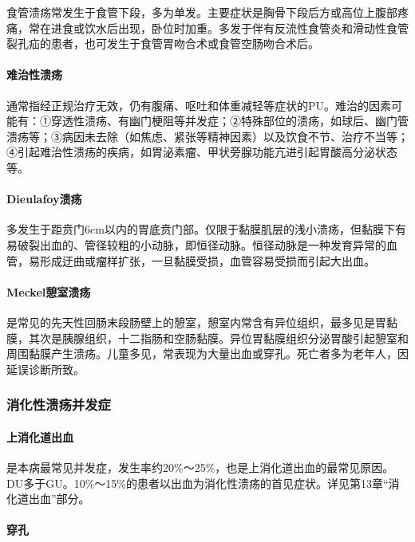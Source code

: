 食管溃疡常发生于食管下段，多为单发。主要症状是胸骨下段后方或高位上腹部疼痛，常在进食或饮水后出现，卧位时加重。多发于伴有反流性食管炎和滑动性食管裂孔疝的患者，也可发生于食管胃吻合术或食管空肠吻合术后。

\paragraph{难治性溃疡}

通常指经正规治疗无效，仍有腹痛、呕吐和体重减轻等症状的PU。难治的因素可能有：①穿透性溃疡、有幽门梗阻等并发症；②特殊部位的溃疡，如球后、幽门管溃疡等；③病因未去除（如焦虑、紧张等精神因素）以及饮食不节、治疗不当等；④引起难治性溃疡的疾病，如胃泌素瘤、甲状旁腺功能亢进引起胃酸高分泌状态等。

\paragraph{Dieulafoy溃疡}

多发生于距贲门6cm以内的胃底贲门部。仅限于黏膜肌层的浅小溃疡，但黏膜下有易破裂出血的、管径较粗的小动脉，即恒径动脉。恒径动脉是一种发育异常的血管，易形成迂曲或瘤样扩张，一旦黏膜受损，血管容易受损而引起大出血。

\paragraph{Meckel憩室溃疡}

是常见的先天性回肠末段肠壁上的憩室，憩室内常含有异位组织，最多见是胃黏膜，其次是胰腺组织，十二指肠和空肠黏膜。异位胃黏膜组织分泌胃酸引起憩室和周围黏膜产生溃疡。儿童多见，常表现为大量出血或穿孔。死亡者多为老年人，因延误诊断所致。

\subsubsection{消化性溃疡并发症}

\paragraph{上消化道出血}

是本病最常见并发症，发生率约20\%～25\%，也是上消化道出血的最常见原因。DU多于GU。10\%～15\%的患者以出血为消化性溃疡的首见症状。详见第13章“消化道出血”部分。

\paragraph{穿孔}

